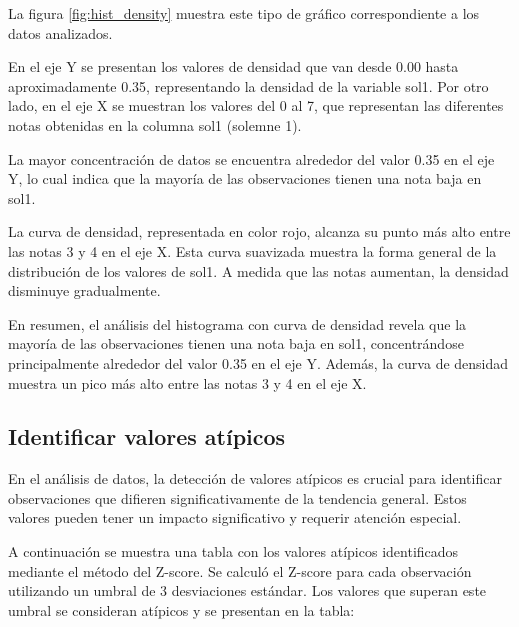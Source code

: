 La figura \ref{fig:hist_density} muestra este tipo de gráfico correspondiente a los datos analizados.

En el eje Y se presentan los valores de densidad que van desde 0.00 hasta aproximadamente 0.35, representando la densidad de la variable sol1. Por otro lado, en el eje X se muestran los valores del 0 al 7, que representan las diferentes notas obtenidas en la columna sol1 (solemne 1).

La mayor concentración de datos se encuentra alrededor del valor 0.35 en el eje Y, lo cual indica que la mayoría de las observaciones tienen una nota baja en sol1.

La curva de densidad, representada en color rojo, alcanza su punto más alto entre las notas 3 y 4 en el eje X. Esta curva suavizada muestra la forma general de la distribución de los valores de sol1. A medida que las notas aumentan, la densidad disminuye gradualmente.

En resumen, el análisis del histograma con curva de densidad revela que la mayoría de las observaciones tienen una nota baja en sol1, concentrándose principalmente alrededor del valor 0.35 en el eje Y. Además, la curva de densidad muestra un pico más alto entre las notas 3 y 4 en el eje X.

\subsection{Identificar valores atípicos}

En el análisis de datos, la detección de valores atípicos es crucial para identificar observaciones que difieren significativamente de la tendencia general. Estos valores pueden tener un impacto significativo y requerir atención especial.

A continuación se muestra una tabla con los valores atípicos identificados mediante el método del Z-score. Se calculó el Z-score para cada observación utilizando un umbral de 3 desviaciones estándar. Los valores que superan este umbral se consideran atípicos y se presentan en la tabla:

